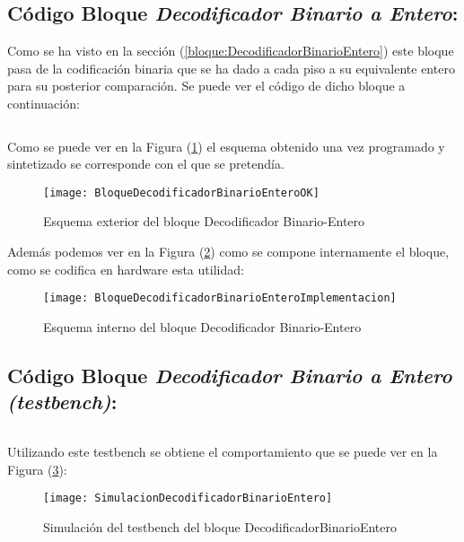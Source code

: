 \subsection{Código Bloque \textit{Decodificador Binario a Entero}:} \label{code:DecodificadorBinarioEntero}
	Como se ha visto en la sección (\ref{bloque:DecodificadorBinarioEntero}) este bloque pasa de la codificación binaria que se ha dado a cada piso a su equivalente entero para su posterior comparación. Se puede ver el código de dicho bloque a continuación: \\ 

    \inputminted[frame=lines,fontsize=\footnotesize,linenos]{vhdl}{CodeFiles/DecodificadorBinarioEntero.vhd}
    
    Como se puede ver en la Figura (\ref{fig:BloqueDecodificadorBinarioEnteroOK}) el esquema obtenido una vez programado y sintetizado se corresponde con el que se pretendía.
    \begin{figure}[H]
		    \centering
		    \texttt{[image: BloqueDecodificadorBinarioEnteroOK]}
		    \caption{Esquema exterior del bloque Decodificador Binario-Entero}
		    \label{fig:BloqueDecodificadorBinarioEnteroOK}
	\end{figure}
    Además podemos ver en la Figura (\ref{fig:BloqueDecodificadorBinarioEnteroImplementacion}) como se compone internamente el bloque, como se codifica en hardware esta utilidad:
    \begin{figure}[H]
		    \centering
		    \texttt{[image: BloqueDecodificadorBinarioEnteroImplementacion]}
		    \caption{Esquema interno del bloque Decodificador Binario-Entero}
		    \label{fig:BloqueDecodificadorBinarioEnteroImplementacion}
	\end{figure}
    
\subsection{Código Bloque \textit{Decodificador Binario a Entero (testbench)}:} \label{code:DecodificadorBinarioEntero_tb}
    \inputminted[frame=lines,fontsize=\footnotesize,linenos]{vhdl}{CodeFiles/DecodificadorBinarioEntero_tb.vhd}

    Utilizando este testbench se obtiene el comportamiento que se puede ver en la Figura (\ref{fig:SimulacionDecodificadorBinarioEntero}):

    \begin{figure}[H]
		    \centering
		    \texttt{[image: SimulacionDecodificadorBinarioEntero]}
		    \caption{Simulación del testbench del bloque DecodificadorBinarioEntero}
		    \label{fig:SimulacionDecodificadorBinarioEntero}
	\end{figure}

